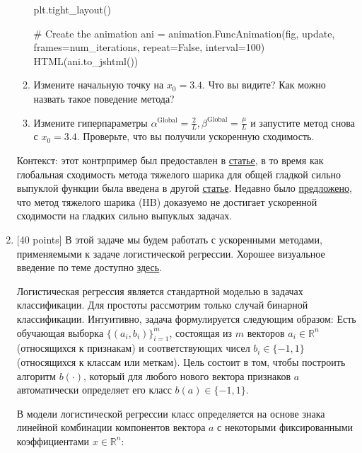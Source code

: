 \documentclass[
  russian,
  letterpaper,
  DIV=11,
  numbers=noendperiod]{scrartcl}
\newenvironment{Shaded}{\begin{snugshade}}{\end{snugshade}}
\newcommand{\CommentTok}[1]{\textcolor[rgb]{0.37,0.37,0.37}{#1}}
\newcommand{\DecValTok}[1]{\textcolor[rgb]{0.68,0.00,0.00}{#1}}
\newcommand{\NormalTok}[1]{\textcolor[rgb]{0.00,0.23,0.31}{#1}}
\newcommand{\OperatorTok}[1]{\textcolor[rgb]{0.37,0.37,0.37}{#1}}
\newcommand{\VariableTok}[1]{\textcolor[rgb]{0.07,0.07,0.07}{#1}}
\begin{document}
\begin{enumerate}
\begin{enumerate}
\begin{Shaded}
\begin{Highlighting}[]
\NormalTok{    plt.tight\_layout()}

\CommentTok{\# Create the animation}
\NormalTok{ani }\OperatorTok{=}\NormalTok{ animation.FuncAnimation(fig, update, frames}\OperatorTok{=}\NormalTok{num\_iterations, repeat}\OperatorTok{=}\VariableTok{False}\NormalTok{, interval}\OperatorTok{=}\DecValTok{100}\NormalTok{)}
\NormalTok{HTML(ani.to\_jshtml())}
\end{Highlighting}
\end{Shaded}
  \item
    Измените начальную точку на \(x_0 = 3.4\). Что вы видите? Как можно
    назвать такое поведение метода?
  \item
    Измените гиперпараметры
    \(\alpha^{\text{Global}} = \frac2L, \beta^{\text{Global}} = \frac{\mu}{L}\)
    и запустите метод снова с \(x_0 = 3.4\). Проверьте, что вы получили
    ускоренную сходимость.
  \end{enumerate}

  Контекст: этот контрпример был предоставлен в
  \href{https://arxiv.org/pdf/1408.3595.pdf}{статье}, в то время как
  глобальная сходимость метода тяжелого шарика для общей гладкой сильно
  выпуклой функции была введена в другой
  \href{https://arxiv.org/pdf/1412.7457.pdf}{статье}. Недавно было
  \href{https://arxiv.org/pdf/2307.11291.pdf}{предложено}, что метод
  тяжелого шарика (HB) доказуемо не достигает ускоренной сходимости на
  гладких сильно выпуклых задачах.
\item
  {[}40 points{]} В этой задаче мы будем работать с ускоренными
  методами, применяемыми к задаче логистической регрессии. Хорошее
  визуальное введение по теме доступно
  \href{https://mlu-explain.github.io/logistic-regression/}{здесь}.

  Логистическая регрессия является стандартной моделью в задачах
  классификации. Для простоты рассмотрим только случай бинарной
  классификации. Интуитивно, задача формулируется следующим образом:
  Есть обучающая выборка \(\{(a_i, b_i)\}_{i=1}^m\), состоящая из \(m\)
  векторов \(a_i \in \mathbb{R}^n\) (относящихся к признакам) и
  соответствующих чисел \(b_i \in \{-1, 1\}\) (относящихся к классам или
  меткам). Цель состоит в том, чтобы построить алгоритм \(b(\cdot)\),
  который для любого нового вектора признаков \(a\) автоматически
  определяет его класс \(b(a) \in \{-1, 1\}\).

  В модели логистической регрессии класс определяется на основе знака
  линейной комбинации компонентов вектора \(a\) с некоторыми
  фиксированными коэффициентами \(x \in \mathbb{R}^n\):


\end{enumerate}
\end{document}
